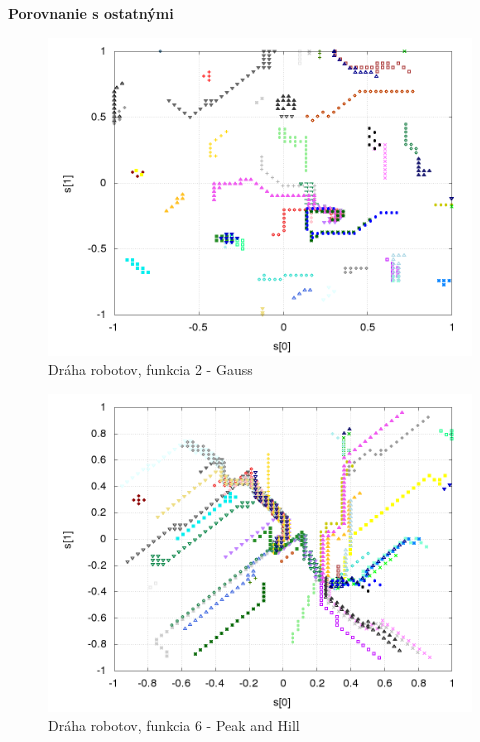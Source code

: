 \documentclass[xcolor=dvipsnames]{beamer}
\begin{document}
\begin{frame}{\bf Porovnanie s ostatnými}

\begin{minipage}{.5\textwidth}

  \begin{figure}[!htb]
  \centering
  \includegraphics[scale=.2]{../../results_q_learning/map_2/function_type_2/iterations_10/agents_path_surface.png}
  \caption{Dráha robotov, funkcia 2 - Gauss}
  \label{img:knn_path}
  \end{figure}


\end{minipage}%
\begin{minipage}{.5\textwidth}

  \begin{figure}[!htb]
  \centering
  \includegraphics[scale=.2]{../../results_q_learning/map_2/function_type_6/iterations_10/agents_path_surface.png}
  \caption{Dráha robotov, funkcia 6 - Peak and Hill}
  \label{img:peak_and_hill_path}
  \end{figure}

\end{minipage}

\end{frame}
\end{document}
